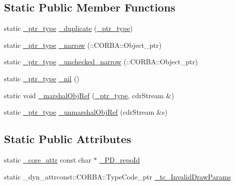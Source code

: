 \subsection*{Static Public Member Functions}
\begin{DoxyCompactItemize}
\item 
static \hyperlink{class_petit_prince_service_ad60338094e415ea827c80f317cdb4f99}{\+\_\+ptr\+\_\+type} \hyperlink{class_petit_prince_service_ade99f57ded6af795e1dc09965ca100e3}{\+\_\+duplicate} (\hyperlink{class_petit_prince_service_ad60338094e415ea827c80f317cdb4f99}{\+\_\+ptr\+\_\+type})
\item 
static \hyperlink{class_petit_prince_service_ad60338094e415ea827c80f317cdb4f99}{\+\_\+ptr\+\_\+type} \hyperlink{class_petit_prince_service_a8f074070252fa4764bc5410b1f2182dc}{\+\_\+narrow} (\+::C\+O\+R\+B\+A\+::\+Object\+\_\+ptr)
\item 
static \hyperlink{class_petit_prince_service_ad60338094e415ea827c80f317cdb4f99}{\+\_\+ptr\+\_\+type} \hyperlink{class_petit_prince_service_ac1671e408aab1ca68be23d6615bab153}{\+\_\+unchecked\+\_\+narrow} (\+::C\+O\+R\+B\+A\+::\+Object\+\_\+ptr)
\item 
static \hyperlink{class_petit_prince_service_ad60338094e415ea827c80f317cdb4f99}{\+\_\+ptr\+\_\+type} \hyperlink{class_petit_prince_service_a0dfd799736ce3bc28fc30de62cb0ff0d}{\+\_\+nil} ()
\item 
static void \hyperlink{class_petit_prince_service_a254ff50226ded2676dcbf12572a7db85}{\+\_\+marshal\+Obj\+Ref} (\hyperlink{class_petit_prince_service_ad60338094e415ea827c80f317cdb4f99}{\+\_\+ptr\+\_\+type}, cdr\+Stream \&)
\item 
static \hyperlink{class_petit_prince_service_ad60338094e415ea827c80f317cdb4f99}{\+\_\+ptr\+\_\+type} \hyperlink{class_petit_prince_service_a15b91eec37ca26c12250fca33d31d58e}{\+\_\+unmarshal\+Obj\+Ref} (cdr\+Stream \&s)
\end{DoxyCompactItemize}
\subsection*{Static Public Attributes}
\begin{DoxyCompactItemize}
\item 
static \hyperlink{_petit_prince_8hpp_a5f7bf7cddb608c2aad7c95f55f8a33c5}{\+\_\+core\+\_\+attr} const char $\ast$ \hyperlink{class_petit_prince_service_a122c277422e3adfb04c5b3851a8b94a1}{\+\_\+\+P\+D\+\_\+repo\+Id}
\item 
static \+\_\+dyn\+\_\+attrconst\+::\+C\+O\+R\+B\+A\+::\+Type\+Code\+\_\+ptr \hyperlink{class_petit_prince_service_af8862791a82a5037ffebad7ab9096817}{\+\_\+tc\+\_\+\+Invalid\+Draw\+Params}
\end{DoxyCompactItemize}


